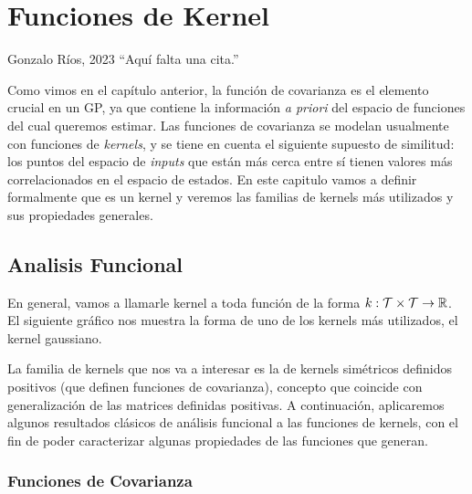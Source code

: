 
\chapter{Funciones de Kernel}


\begin{chapquote}{Gonzalo Ríos, 2023}
	``Aquí falta una cita.''
\end{chapquote}

Como vimos en el capítulo anterior, la función de covarianza es el elemento crucial en un GP, ya que contiene la información \emph{a priori} del espacio de funciones del cual queremos estimar. Las funciones de covarianza se modelan usualmente con funciones de \emph{kernels}, y se tiene en cuenta el siguiente supuesto de similitud: los puntos del espacio de \emph{inputs} que están más cerca entre sí tienen valores más correlacionados en el espacio de estados. En este capitulo vamos a definir formalmente que es un kernel y veremos las familias de kernels más utilizados y sus propiedades generales.



\section{Analisis Funcional}


En general, vamos a llamarle kernel a toda función de la forma \(k : \mathcal{T} \times \mathcal{T} \to \mathbb{R}\). El siguiente gráfico nos muestra la forma de uno de los kernels más utilizados, el kernel gaussiano.

La familia de kernels que nos va a interesar es la de kernels simétricos definidos positivos (que definen funciones de covarianza), concepto que coincide con generalización de las matrices definidas positivas. A continuación, aplicaremos algunos resultados clásicos de análisis funcional a las funciones de kernels, con el fin de poder caracterizar algunas propiedades de las funciones que generan.

\subsection{Funciones de Covarianza}


